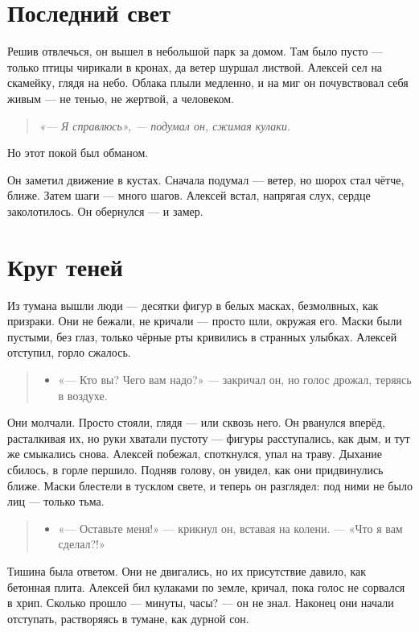 \documentclass[12pt,a4paper]{book}
\newenvironment{dialogue}{\begin{quote}\itshape\begin{itemize}\item[]}{\end{itemize}\end{quote}}
\newenvironment{innerthought}{\begin{quote}\small\itshape}{\end{quote}}
\begin{document}
\section{Последний свет}

Решив отвлечься, он вышел в небольшой парк за домом. Там было пусто — только птицы чирикали в кронах, да ветер шуршал листвой. Алексей сел на скамейку, глядя на небо. Облака плыли медленно, и на миг он почувствовал себя живым — не тенью, не жертвой, а человеком.

\begin{innerthought}
«— Я справлюсь», — подумал он, сжимая кулаки.
\end{innerthought}

Но этот покой был обманом.

Он заметил движение в кустах. Сначала подумал — ветер, но шорох стал чётче, ближе. Затем шаги — много шагов. Алексей встал, напрягая слух, сердце заколотилось. Он обернулся — и замер.

\section{Круг теней}

Из тумана вышли люди — десятки фигур в белых масках, безмолвных, как призраки. Они не бежали, не кричали — просто шли, окружая его. Маски были пустыми, без глаз, только чёрные рты кривились в странных улыбках. Алексей отступил, горло сжалось.

\begin{dialogue}
«— Кто вы? Чего вам надо?» — закричал он, но голос дрожал, теряясь в воздухе.
\end{dialogue}

Они молчали. Просто стояли, глядя — или сквозь него. Он рванулся вперёд, расталкивая их, но руки хватали пустоту — фигуры расступались, как дым, и тут же смыкались снова. Алексей побежал, споткнулся, упал на траву. Дыхание сбилось, в горле першило. Подняв голову, он увидел, как они придвинулись ближе. Маски блестели в тусклом свете, и теперь он разглядел: под ними не было лиц — только тьма.

\begin{dialogue}
«— Оставьте меня!» — крикнул он, вставая на колени. — «Что я вам сделал?!»
\end{dialogue}

Тишина была ответом. Они не двигались, но их присутствие давило, как бетонная плита. Алексей бил кулаками по земле, кричал, пока голос не сорвался в хрип. Сколько прошло — минуты, часы? — он не знал. Наконец они начали отступать, растворяясь в тумане, как дурной сон.
\end{document}
